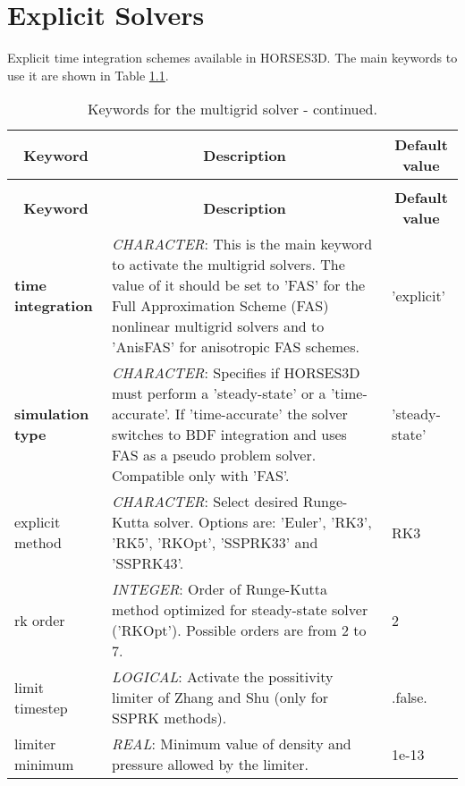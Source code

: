 \documentclass[a4paper,10pt]{report}
\begin{document}

\chapter{Explicit Solvers}

Explicit time integration schemes available in HORSES3D.
The main keywords to use it are shown in Table \ref{tab:explicitKey}.

\begin{longtable}{|p{4cm}|p{10cm}|p{2.2cm}|}
\caption{Keywords for the multigrid solver.} \label{tab:explicitKey} \\
\hline
\multicolumn{1}{|c|}{\textbf{Keyword}} & \multicolumn{1}{c|}{\textbf{Description}} & \multicolumn{1}{c|}{\textbf{Default value}} \\ \hline
\endfirsthead

\caption{Keywords for the multigrid solver - continued.} \\
\hline
\multicolumn{1}{|c|}{\textbf{Keyword}} & \multicolumn{1}{c|}{\textbf{Description}} & \multicolumn{1}{c|}{\textbf{Default value}} \\ \hline
\endhead

\textbf{time integration} & \textit{CHARACTER}: This is the main keyword to activate the multigrid solvers. The value of it should be set to 'FAS' for the Full Approximation Scheme (FAS) nonlinear multigrid  solvers and to 'AnisFAS' for anisotropic FAS schemes. & 'explicit' \\ \hline

\textbf{simulation type} & \textit{CHARACTER}: Specifies if HORSES3D must perform a ’steady-state’ or a ’time-accurate’. If 'time-accurate' the solver switches to BDF integration and uses FAS as a pseudo problem solver. Compatible only with 'FAS'. & 'steady-state' \\ \hline

explicit method & \textit{CHARACTER}: Select desired Runge-Kutta solver. Options are: 'Euler', 'RK3', 'RK5', 'RKOpt', 'SSPRK33' and 'SSPRK43'. & RK3 \\ \hline

rk order & \textit{INTEGER}: Order of Runge-Kutta method optimized for steady-state solver ('RKOpt'). Possible orders are from 2 to 7. & 2 \\ \hline

limit timestep & \textit{LOGICAL}: Activate the possitivity limiter of Zhang and Shu (only for SSPRK methods). & .false. \\ \hline

limiter minimum & \textit{REAL}: Minimum value of density and pressure allowed by the limiter. & 1e-13 \\ \hline

\end{longtable}
\end{document}
